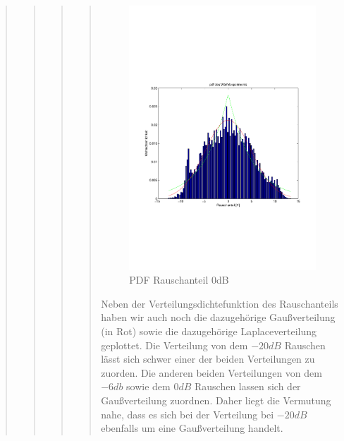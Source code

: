 \begin{quote}
\begin{quote}
\begin{quote}
\begin{quote}
        \begin{figure}[H]
        \centering
            \includegraphics[scale=0.6, trim = 1cm 6.5cm 1cm 7.5cm, clip]{./Bilder/PDFRauschen0dB}
                \caption{PDF Rauschanteil 0dB}
        \end{figure}
        
        
        Neben der Verteilungsdichtefunktion des Rauschanteils haben wir auch noch die dazugehörige Gaußverteilung (in
        Rot) sowie die dazugehörige Laplaceverteilung geplottet. Die Verteilung von dem $-20dB$ Rauschen lässt sich
        schwer einer der beiden Verteilungen zu zuorden. Die anderen beiden Verteilungen von dem $-6db$ sowie dem $0dB$
        Rauschen lassen sich der Gaußverteilung zuordnen. Daher liegt die Vermutung nahe, dass es sich bei der
        Verteilung bei $-20dB$ ebenfalls um eine Gaußverteilung handelt.\vspace{1em}
        

\end{quote}
\end{quote}
\end{quote}
\end{quote}
